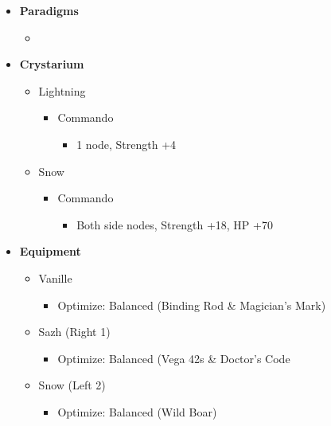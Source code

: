 \begin{menu}
\begin{itemize}
    \item \textbf{Paradigms}
    \begin{itemize}
        \item {}%
{\paradigmline{(\rav)}{\rav}{\rav}}%
{\paradigmline{\com}{\sen}{\med}}%
{\paradigmline[3]{\textit{[\com]}}{\textit{\com}}{\textit{\rav}}}%
{\paradigmline{[\com]}{\com}{\rav}}
    \end{itemize}
    \item \textbf{Crystarium}
    \begin{itemize}
        \item Lightning
        \begin{itemize}
            \item Commando
            \begin{itemize}
                \item 1 node, Strength +4
            \end{itemize}
        \end{itemize}
        \item Snow
        \begin{itemize}
            \item Commando
            \begin{itemize}
                \item Both side nodes, Strength +18, HP +70
            \end{itemize}
        \end{itemize}
    \end{itemize}
    
    \item \textbf{Equipment}
    \begin{itemize}
        \item Vanille
        \begin{itemize}
            \item Optimize: Balanced (Binding Rod \& Magician's Mark)
        \end{itemize}
        \item Sazh (Right 1)
        \begin{itemize}
            \item Optimize: Balanced (Vega 42s \& Doctor's Code
        \end{itemize}
        \item Snow (Left 2)
        \begin{itemize}
            \item Optimize: Balanced (Wild Boar)
        \end{itemize}
    \end{itemize}
\end{itemize}
\end{menu}

